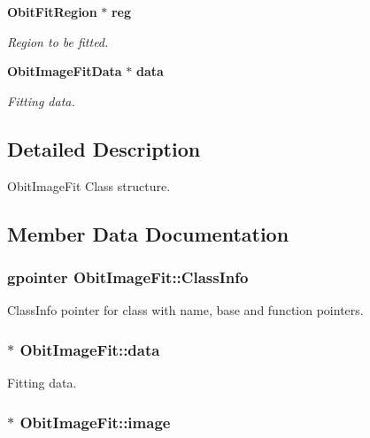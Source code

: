 \begin{CompactItemize}
{\bf Obit\-Fit\-Region} $\ast$ {\bf reg}
\begin{CompactList}\small\item\em Region to be fitted. \item\end{CompactList}\item 
{\bf Obit\-Image\-Fit\-Data} $\ast$ {\bf data}
\begin{CompactList}\small\item\em Fitting data. \item\end{CompactList}\end{CompactItemize}


\subsection{Detailed Description}
Obit\-Image\-Fit Class structure. 



\subsection{Member Data Documentation}
\subsubsection{\setlength{\rightskip}{0pt plus 5cm}gpointer {\bf Obit\-Image\-Fit::Class\-Info}}\label{structObitImageFit_o1}


Class\-Info pointer for class with name, base and function pointers. 

\subsubsection{$\ast$ {\bf Obit\-Image\-Fit::data}}\label{structObitImageFit_o7}


Fitting data. 

\subsubsection{$\ast$ {\bf Obit\-Image\-Fit::image}}\label{structObitImageFit_o5}


